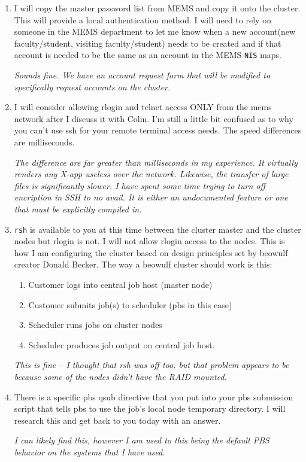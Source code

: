 \documentclass[10pt]{article}
\begin{document}
\begin{enumerate}
\item I will copy the master password list from MEMS and copy it onto the
cluster. This will provide a local authentication method. I will need to
rely on someone in the MEMS department to let me know when a new account(new
faculty/student, visiting faculty/student) needs to be created and if that
account is needed to be the same as an account in the MEMS {\tt NIS} maps.

{\em Sounds fine.  We have an account request form that will be modified to
specifically request accounts on the cluster.}

\item I will consider allowing rlogin and telnet access ONLY from the mems
network after I discuss it with Colin. I'm still a little bit confused as to
why you can't use ssh for your remote terminal access needs. The speed
differences are milliseconds.

{\em The difference are far greater than milliseconds in my experience.  It
virtually renders any X-app useless over the network.  Likewise, the
transfer of large files is significantly slower.  I have spent some time
trying to turn off encription in SSH to no avail.  It is either an
undocumented feature or one that must be explicitly compiled in.}

\item {\tt rsh} is available to you at this time between the cluster master
and the cluster nodes but rlogin is not. I will not allow rlogin access to the
nodes. This is how I am configuring the cluster based on design principles set
by beowulf creator Donald Becker. The way a beowulf cluster should work is
this:
\begin{enumerate}
\item Customer logs into central job host (master node)
\item Customer submits job(s) to scheduler (pbs in this case)
\item Scheduler runs jobs on cluster nodes
\item Scheduler produces job output on central job host.
\end{enumerate}

{\em This is fine -- I thought that rsh was off too, but that problem appears
to be because some of the nodes didn't have the RAID mounted.}

\item There is a specific pbs qsub directive that you put into your pbs
submission script that tells pbs to use the job's local node temporary
directory. I will research this and get back to you today with an answer.

{\em I can likely find this, however I am used to this being the default PBS
behavior on the systems that I have used.}

\end{enumerate}
\end{document}
